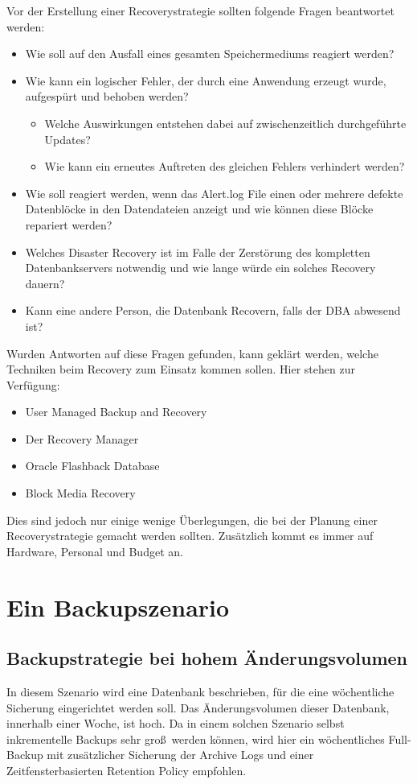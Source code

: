         Vor der Erstellung einer Recoverystrategie sollten folgende Fragen beantwortet werden:
        \begin{itemize}
          \item Wie soll auf den Ausfall eines gesamten Speichermediums reagiert werden?
          \item Wie kann ein logischer Fehler, der durch eine Anwendung erzeugt wurde, aufgesp\"urt und behoben werden?
            \begin{itemize}
              \item Welche Auswirkungen entstehen dabei auf zwischenzeitlich durchgef\"uhrte Updates?
              \item Wie kann ein erneutes Auftreten des gleichen Fehlers verhindert werden?
            \end{itemize}
          \item Wie soll reagiert werden, wenn das Alert.log File einen oder mehrere defekte Datenbl\"ocke in den Datendateien anzeigt und wie k\"onnen diese Bl\"ocke repariert werden?
          \item Welches Disaster Recovery ist im Falle der Zerst\"orung des kompletten Datenbankservers notwendig und wie lange w\"urde ein solches Recovery dauern?
          \item Kann eine andere Person, die Datenbank Recovern, falls der DBA abwesend ist?
        \end{itemize}
        Wurden Antworten auf diese Fragen gefunden, kann gekl\"art werden, welche Techniken beim Recovery zum Einsatz kommen sollen. Hier stehen zur Verf\"ugung:
        \begin{itemize}
          \item User Managed Backup and Recovery
          \item Der Recovery Manager
          \item Oracle Flashback Database
          \item Block Media Recovery
        \end{itemize}
        Dies sind jedoch nur einige wenige \"Uberlegungen, die bei der Planung einer Recoverystrategie gemacht werden sollten. Zus\"atzlich kommt es immer auf Hardware, Personal und Budget an.
    \section{Ein Backupszenario}
      \label{backupszenarios}
      \subsection{Backupstrategie bei hohem \"Anderungsvolumen}
        In diesem Szenario wird eine Datenbank beschrieben, f\"ur die eine w\"ochentliche Sicherung eingerichtet werden soll. Das \"Anderungsvolumen dieser Datenbank, innerhalb einer Woche, ist hoch. Da in einem solchen Szenario selbst inkrementelle Backups sehr gro\ss\ werden k\"onnen, wird hier ein w\"ochentliches Full-Backup mit zus\"atzlicher Sicherung der Archive Logs und einer Zeitfensterbasierten Retention Policy empfohlen.

